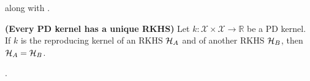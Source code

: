 \begin{my_proof}
	 \cite[Lemma~2]{berlinet2011reproducing} along with \citep[Theorem~4.20]{steinwart2008svm_book}.
\end{my_proof}

\begin{proposition}
	\label{prop.unique_rkhs}
	\textbf{(Every PD kernel has a unique RKHS)} 
	Let $k: \mathcal{X} \times \mathcal{X} \rightarrow \mathbb{R}$ be a PD kernel. If $k$ is the reproducing kernel of an RKHS $\mathcal{H}_A$ and of another RKHS $\mathcal{H}_B$, then $\mathcal{H}_A = \mathcal{H}_B$.
\end{proposition}

\begin{my_proof}
	\citep[Theorem~4.21]{steinwart2008svm_book}.
\end{my_proof}


